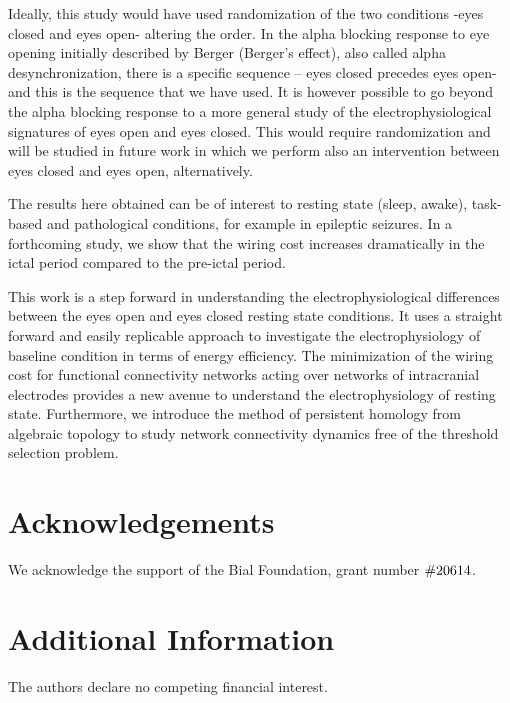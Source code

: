 \documentclass[11pt, onecolumn]{article}
\begin{document}
Ideally, this study would have used randomization of the two conditions -eyes closed and eyes open- altering the order. In the alpha blocking response to eye opening initially described by Berger (Berger’s effect), also called alpha desynchronization, there is a specific sequence – eyes closed precedes eyes open- and this is the sequence that we have used.
It is however possible to go beyond the alpha blocking response to a more general study of the electrophysiological signatures of eyes open and eyes closed. This would require randomization and will be studied in future work in which we perform also an intervention between eyes closed and eyes open, alternatively.

The results here obtained can be of interest to resting state (sleep, awake), task-based and pathological conditions, for example in epileptic seizures. In a forthcoming study, we show that the wiring cost increases dramatically in the ictal period compared to the pre-ictal period.   

This work is a step forward in understanding the electrophysiological differences between the eyes open and eyes closed resting state conditions. It uses a straight forward and easily replicable approach to investigate the electrophysiology of baseline condition in terms of energy efficiency. The minimization of the wiring cost for functional connectivity networks acting over networks of intracranial electrodes provides a new avenue to understand the electrophysiology of resting state. Furthermore, we introduce the method of persistent homology from algebraic topology to study network connectivity dynamics free of the threshold selection problem.


\section*{Acknowledgements}
We acknowledge the support of the Bial Foundation, grant number  $\#206\/14$.
\section*{Additional Information}
The authors declare no competing financial interest.
\end{document}
